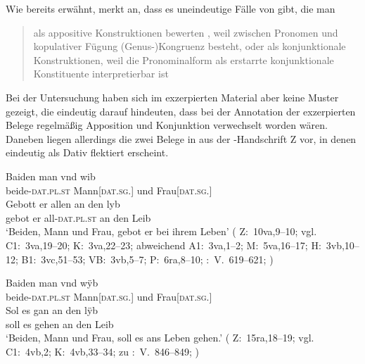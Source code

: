 Wie bereits erwähnt, merkt \citet{gjelsten1980} an, dass es uneindeutige Fälle
von  gibt, die man \blockcquote[187]{gjelsten1980}{als
appositive Konstruktionen bewerten , weil zwischen Pronomen und
kopulativer Fügung (Genus-)Kongruenz besteht, oder als konjunktionale
Konstruktionen, weil die Pronominalform als erstarrte konjunktionale
Konstituente interpretierbar ist}. Bei der Untersuchung haben sich im
exzerpierten Material aber keine Muster gezeigt, die eindeutig darauf
hindeuten, dass bei der Annotation der exzerpierten Belege regelmäßig
Apposition und Konjunktion verwechselt worden wären. Daneben liegen allerdings
die zwei Belege in  aus der \KC{}-Handschrift Z
vor, in denen  eindeutig als Dativ flektiert erscheint.

\begin{exe}
\ex \label{ex:kczbeidenundesynt1}
\begin{xlist}
	\ex \label{ex:kczbeidenundesynt1_1}
		\gll Baiden man vnd wib \\
			beide-\textsc{dat.pl\subMF.st} Mann[\textsc{dat.sg.\MascM}] und
				Frau[\textsc{dat.sg.\NeutF}] \\
	\sn \gll Gebott er allen an den lyb \\
			gebot er all-\textsc{dat.pl\subMF.st} an den Leib \\
		\trans `Beiden, Mann und Frau, gebot er bei ihrem Leben'
			(%
				Z:~10va,9--10; vgl.
				C1:~3va,19--20; %
				K:~3va,22--23; abweichend %
				A1:~3va,1--2; %
				M:~5va,16--17; %
				H:~3vb,10--12; %
				B1:~3vc,51--53; %
				VB:~3vb,5--7; %
				P:~6ra,8--10; %
				\KC:~V.~619--621;
				\cite[92]{schroeder1895}%
			)

\ex \label{ex:kczbeidenundesynt1_2}
	\gll Baiden man vnd wÿb \\
			beide-\textsc{dat.pl\subMF.st} Mann[\textsc{dat.sg.\MascM}] und
				Frau[\textsc{dat.sg.\NeutF}] \\
	\sn \gll Sol es gan an den lÿb \\
			soll es gehen an den Leib \\
		\trans `Beiden, Mann und Frau, soll es ans Leben gehen.'
			(%
				Z:~15ra,18--19; vgl.
				C1:~4vb,2; %
				K:~4vb,33--34; zu %
				\KC:~V.~846--849;
				\cite[97]{schroeder1895}%
			)
\end{xlist}
\end{exe}

